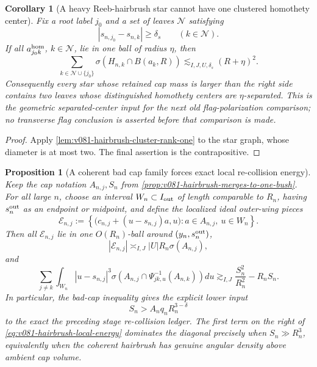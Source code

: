 \documentclass[10pt]{article}
\newtheorem{proposition}[theorem]{Proposition}
\newtheorem{corollary}[theorem]{Corollary}
\begin{document}
\begin{corollary}[A heavy Reeb-hairbrush star cannot have one clustered homothety center]
\label{cor:v081-hairbrush-heavy-star-center-separation}
Fix a root label \(j_0\) and a set of leaves \(\mathcal N\) satisfying
\[
|s_{n,j_0}-s_{n,k}|\ge\delta_s
\qquad(k\in\mathcal N).
\]
If all \(a_{j_0k}^{\rm hom}\), \(k\in\mathcal N\), lie in one ball of radius \(\eta\), then
\begin{equation}
\label{eq:v081-hairbrush-clustered-star-mass}
\boxed{
\sum_{k\in\mathcal N\cup\{j_0\}}
\sigma\!\left(H_{n,k}\cap B(a_k,R)
\right)
\lesssim_{I,J,U,\delta_s}
(R+\eta)^2.
}
\end{equation}
Consequently every star whose retained cap mass is larger than the right side contains two leaves
whose distinguished homothety centers are \(\eta\)-separated.  This is the geometric
separated-center input for the next old flag-polarization comparison; no transverse flag conclusion
is asserted before that comparison is made.
\end{corollary}

\begin{proof}
Apply \cref{lem:v081-hairbrush-cluster-rank-one} to the star graph, whose diameter is at most two.
The final assertion is the contrapositive.
\end{proof}

\begin{proposition}[A coherent bad cap family forces exact local re-collision energy]
\label{prop:v081-hairbrush-local-recollision-energy}
Keep the cap notation \(A_{n,j},S_n\) from
\cref{prop:v081-hairbrush-merges-to-one-bush}.
For all large \(n\), choose an interval \(W_n\subset I_{\rm out}\) of length comparable to
\(R_n\), having \(s_n^{\rm out}\) as an endpoint or midpoint, and define the localized ideal
outer-wing pieces
\[
\mathcal E_{n,j}
:=
\left\{
\bigl(c_{n,j}+(u-s_{n,j})a,u\bigr):
a\in A_{n,j},\ u\in W_n
\right\}.
\]
Then all \(\mathcal E_{n,j}\) lie in one \(O(R_n)\)-ball around
\((y_n,s_n^{\rm out})\),
\[
|\mathcal E_{n,j}|\asymp_{I,J}|U|R_n\sigma(A_{n,j}),
\]
and
\begin{equation}
\label{eq:v081-hairbrush-local-energy}
\boxed{
\sum_{j\ne k}
\int_{W_n}
|u-s_{n,j}|^3
\sigma\!\left(
A_{n,j}\cap\Psi_{jk,u}^{-1}(A_{n,k})
\right)du
\gtrsim_{I,J}
\frac{S_n^2}{R_n^2}-R_nS_n.
}
\end{equation}
In particular, the bad-cap inequality gives the explicit lower input
\begin{equation}
\label{eq:v081-hairbrush-local-energy-input}
S_n>A_nq_nR_n^{3-\delta}
\end{equation}
to the exact the preceding stage re-collision ledger.  The first term on the right of
\eqref{eq:v081-hairbrush-local-energy} dominates the diagonal precisely when
\(S_n\gg R_n^3\), equivalently when the coherent hairbrush has genuine angular density above
ambient cap volume.
\end{proposition}
\end{document}
